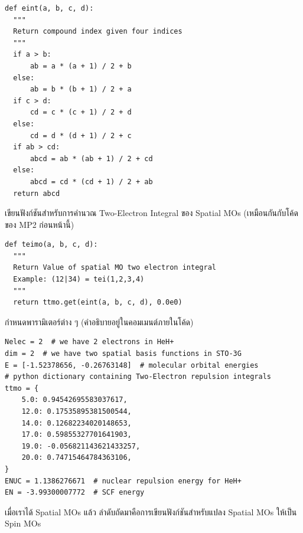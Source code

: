 \begin{lstlisting}[style=MyPython]
def eint(a, b, c, d):
  """
  Return compound index given four indices
  """
  if a > b:
      ab = a * (a + 1) / 2 + b
  else:
      ab = b * (b + 1) / 2 + a
  if c > d:
      cd = c * (c + 1) / 2 + d
  else:
      cd = d * (d + 1) / 2 + c
  if ab > cd:
      abcd = ab * (ab + 1) / 2 + cd
  else:
      abcd = cd * (cd + 1) / 2 + ab
  return abcd
\end{lstlisting}

\vspace{5pt}

\noindent เขียนฟังก์ชันสำหรับการคำนวณ Two-Electron Integral ของ Spatial MOs (เหมือนกันกับโค้ดของ MP2 ก่อนหน้านี้)

\vspace{5pt}

\begin{lstlisting}[style=MyPython]
def teimo(a, b, c, d):
  """
  Return Value of spatial MO two electron integral
  Example: (12|34) = tei(1,2,3,4)
  """
  return ttmo.get(eint(a, b, c, d), 0.0e0)
\end{lstlisting}

\vspace{5pt}

\noindent กำหนดพารามิเตอร์ต่าง ๆ (คำอธิบายอยู่ในคอมเมนต์ภายในโค้ด)

\vspace{5pt}

\begin{lstlisting}[style=MyPython]
Nelec = 2  # we have 2 electrons in HeH+
dim = 2  # we have two spatial basis functions in STO-3G
E = [-1.52378656, -0.26763148]  # molecular orbital energies
# python dictionary containing Two-Electron repulsion integrals
ttmo = {
    5.0: 0.94542695583037617,
    12.0: 0.17535895381500544,
    14.0: 0.12682234020148653,
    17.0: 0.59855327701641903,
    19.0: -0.056821143621433257,
    20.0: 0.74715464784363106,
}
ENUC = 1.1386276671  # nuclear repulsion energy for HeH+
EN = -3.99300007772  # SCF energy
\end{lstlisting}

\vspace{5pt}

\noindent เมื่อเราได้ Spatial MOs แล้ว ลำดับถัดมาคือการเขียนฟังก์ชันสำหรับแปลง Spatial MOs ให้เป็น Spin MOs

\vspace{5pt}

